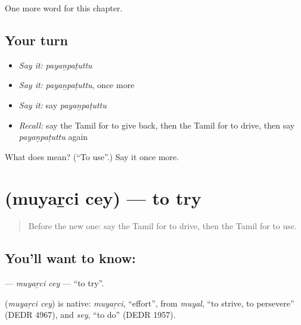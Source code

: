 \begin{grammarlens}[title={What you've built}]
One more word for this chapter.
\end{grammarlens}

\subsection*{Your turn}
\begin{itemize}
\raggedright
  \item \emph{Say it:} \emph{payaṉpaṭuttu}
  \item \emph{Say it:} \emph{payaṉpaṭuttu}, once more
  \item \emph{Say it:} say \emph{payaṉpaṭuttu}
  \item \emph{Recall:} say the Tamil for to give back, then the Tamil for to drive, then say \emph{payaṉpaṭuttu} again
\end{itemize}

\begin{tcolorbox}[breakable,colback=teal!4,colframe=teal!35!black,title={Before you move on}]
What does  mean? (\textquotedblleft{}To use\textquotedblright{}.) Say it once more.
\end{tcolorbox}
\section[\texorpdfstring{\ta{முயற்சி} \ta{செய்} (muyaṟci cey)}{முயற்சி செய் (muyaṟci cey)}]{  (muyaṟci cey) — to try}

\label{lesson:TA-C195-muyarci-cey}



\begin{quote}
Before the new one: say the Tamil for to drive, then the Tamil for to use.
\end{quote}

\subsection*{You'll want to know:  }
\textbf{ } — \emph{muyaṟci cey} — \textquotedblleft{}to try\textquotedblright{}.

\begin{cousinweb}
\textbf{ } (\emph{muyaṟci cey}) is native: \emph{muyaṟci}, \textquotedblleft{}effort\textquotedblright{}, from \emph{muyal}, \textquotedblleft{}to strive, to persevere\textquotedblright{} (DEDR 4967), and \emph{sey}, \textquotedblleft{}to do\textquotedblright{} (DEDR 1957).
\end{cousinweb}

